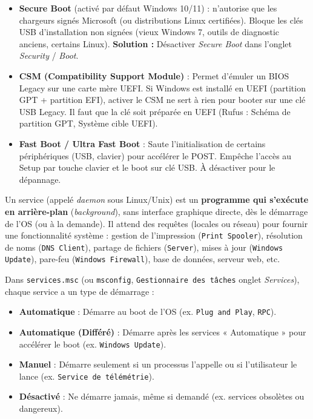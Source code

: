 \documentclass[11pt]{article}
\newcommand{\cle}[1]{{\popxbold\color{popdark}#1}}
\newcounter{popsec}
\newcounter{popsub}
\newcommand{\courssub}[1]{%
  \stepcounter{popsub}%
  \par\vspace{9pt}\noindent{\popxbold\fontsize{11.5}{13}\selectfont\color{popink}{\color{poporange}\thepopsec.\thepopsub}\hspace{6pt}#1}\par\nopagebreak\vspace{4pt}
}
\begin{document}
\begin{attention}
\begin{itemize}
    \item \textbf{Secure Boot} (activé par défaut Windows 10/11) : n'autorise que les chargeurs signés Microsoft (ou distributions Linux certifiées). Bloque les clés USB d'installation non signées (vieux Windows 7, outils de diagnostic anciens, certains Linux). \textbf{Solution :} Désactiver \emph{Secure Boot} dans l'onglet \emph{Security} / \emph{Boot}.
    \item \textbf{CSM (Compatibility Support Module)} : Permet d'émuler un BIOS Legacy sur une carte mère UEFI. Si Windows est installé en UEFI (partition GPT + partition EFI), activer le CSM ne sert à rien pour booter sur une clé USB Legacy. Il faut que la clé soit préparée en UEFI (Rufus : Schéma de partition GPT, Système cible UEFI).
    \item \textbf{Fast Boot / Ultra Fast Boot} : Saute l'initialisation de certains périphériques (USB, clavier) pour accélérer le POST. Empêche l'accès au Setup par touche clavier et le boot sur clé USB. À désactiver pour le dépannage.
\end{itemize}
\end{attention}

\courssub{Les services du système d'exploitation}

\begin{definition}
Un \cle{service} (appelé \emph{daemon} sous Linux/Unix) est un \textbf{programme qui s'exécute en arrière-plan} (\emph{background}), sans interface graphique directe, dès le démarrage de l'OS (ou à la demande). Il attend des requêtes (locales ou réseau) pour fournir une fonctionnalité système : gestion de l'impression (\texttt{Print Spooler}), résolution de noms (\texttt{DNS Client}), partage de fichiers (\texttt{Server}), mises à jour (\texttt{Windows Update}), pare-feu (\texttt{Windows Firewall}), base de données, serveur web, etc.
\end{definition}

\begin{propriete}
Dans \texttt{services.msc} (ou \texttt{msconfig}, \texttt{Gestionnaire des tâches} onglet \emph{Services}), chaque service a un type de démarrage :
\begin{itemize}
    \item \textbf{Automatique} : Démarre au boot de l'OS (ex. \texttt{Plug and Play}, \texttt{RPC}).
    \item \textbf{Automatique (Différé)} : Démarre après les services « Automatique » pour accélérer le boot (ex. \texttt{Windows Update}).
    \item \textbf{Manuel} : Démarre seulement si un processus l'appelle ou si l'utilisateur le lance (ex. \texttt{Service de télémétrie}).
    \item \textbf{Désactivé} : Ne démarre jamais, même si demandé (ex. services obsolètes ou dangereux).
\end{itemize}
\end{propriete}
\end{document}
